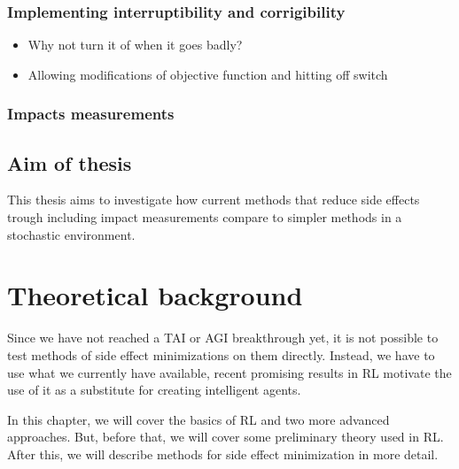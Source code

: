 \documentclass[12pt,A4]{report}
\newcommand{\autobaj}{}
\theoremstyle{definition}
\begin{document}
\subsection{Implementing interruptibility and corrigibility}
\begin{itemize}
    \item Why not turn it of when it goes badly?
    \item Allowing modifications of objective function and hitting off switch
\end{itemize}

\subsection{Impacts measurements}


\section{Aim of thesis}
This thesis aims to investigate how current methods that reduce side effects trough including impact measurements compare to simpler methods in a stochastic environment.


 


\chapter{Theoretical background}
Since we have not reached a TAI or AGI breakthrough yet, it is not possible to test methods of side effect minimizations on them directly. Instead, we have to use what we currently have available, recent promising results in RL motivate the use of it as a substitute for creating intelligent agents.

In this chapter, we will cover the basics of RL and two more advanced approaches. But, before that, we will cover some preliminary theory used in RL. After this, we will describe methods for side effect minimization in more detail.
\end{document}
